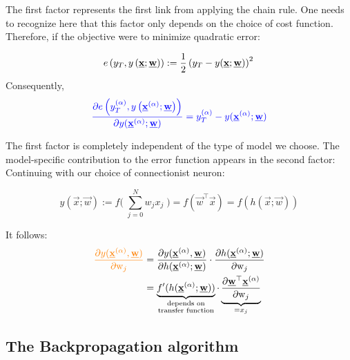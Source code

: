 \begin{frame}
    The first factor
    represents the first link from applying the chain rule. One needs to recognize here that this factor only depends on the choice of cost function.\\
    Therefore, if the objective were to minimize quadratic error:
    
    \begin{equation}
			e\tyxw := \frac{1}{2} \left( y_T - y(\vec{x}; \vec w) \right)^2{}
    \end{equation}
    Consequently,
    \begin{equation}
			\textcolor{blue}{\frac{\partial e\tyxwalpha}{
					\partial y{(\vec{x}^{(\alpha)}; \vec{w})} }
				= y_T^{(\alpha)} - y{(\vec{x}^{(\alpha)}; \vec{w})}}
    \end{equation}
    
    The first factor is completely independent of the type of model we choose. The model-specific contribution to the error function appears in the second factor:
    Continuing with our choice of connectionist neuron:
    
    \begin{equation}
            y(\vec x; \vec w) := 
            f \Big(\; \sum_{j=0}^{N} {w}_{j} {x}_j
            \; \Big){}
            = f \left( \vec w^{\top} \vec x\right)
            = f \left( h (\vec x; \vec w)\right)
    \end{equation}
    
    It follows:
    \begin{align}
			\textcolor{orange}{
			\frac{\partial y(\vec{x}^{(\alpha)}, \vec{w})}
            {\partial \mathrm{w}_{j}}}
            &= \frac{\partial y(\vec{x}^{(\alpha)}, \vec{w})}
            {\partial h(\vec x^{(\alpha)}; \vec w)}
            \cdot
            \frac{\partial h(\vec x^{(\alpha)}; \vec w)}
            {\partial \mathrm{w}_{j}}\\
            &= \underbrace{f'(h(\vec x^{(\alpha)}; \vec w))}_{\substack{\text{depends on}\\ \text{transfer function}}}
            \cdot
            \underbrace{
                \frac{\partial \vec w^{\top} \vec x^{(\alpha)}}
                {\partial \mathrm{w}_{j}}
            }_{=x_{j}}
	\end{align}
    
\end{frame}

\subsection{The Backpropagation algorithm}

